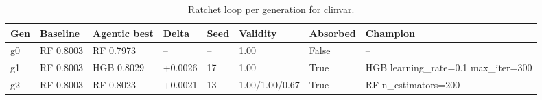 \begin{table}[H]
\centering\small
\caption{Ratchet loop per generation for clinvar.}
\label{tab:ratchet-generations-ratchet-ledger-clinvar}
\begin{tabular}{llllllll}
\toprule
Gen & Baseline & Agentic best & Delta & Seed & Validity & Absorbed & Champion \\
\midrule
g0 & RF 0.8003 & RF 0.7973 & -- & -- & 1.00 & False & -- \\
g1 & RF 0.8003 & HGB 0.8029 & +0.0026 & 17 & 1.00 & True & HGB learning\_rate=0.1 max\_iter=300 \\
g2 & RF 0.8003 & RF 0.8023 & +0.0021 & 13 & 1.00/1.00/0.67 & True & RF n\_estimators=200 \\
\bottomrule
\end{tabular}
\end{table}

